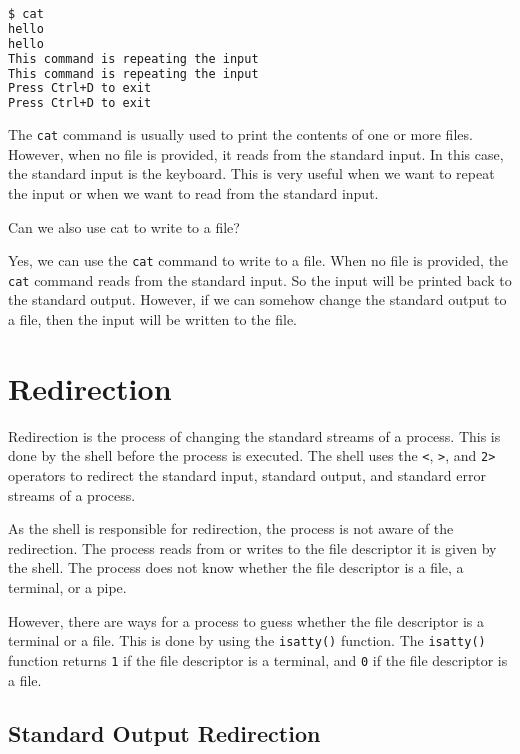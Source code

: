\begin{lstlisting}[language=bash]
$ cat
hello
hello
This command is repeating the input
This command is repeating the input
Press Ctrl+D to exit
Press Ctrl+D to exit
\end{lstlisting}

The \lstinline|cat| command is usually used to print the contents of one
or more files. However, when no file is provided, it reads from the
standard input. In this case, the standard input is the keyboard.
This is very useful when we want to repeat the input or when we want
to read from the standard input.

\begin{qs}
  Can we also use cat to write to a file?
\end{qs}

\begin{ans}
  Yes, we can use the \lstinline|cat| command to write to a file. When
  no file is provided, the \lstinline|cat| command reads from the standard
  input. So the input will be printed back to the standard output.
  However, if we can somehow change the standard output to a file,
  then the input will be written to the file.
\end{ans}

\section{Redirection}

Redirection is the process of changing the standard streams of a process.
This is done by the shell before the process is executed. The shell
uses the \lstinline|<|, \lstinline|>|, and \lstinline|2>| operators to redirect
the standard input, standard output, and standard error streams of a
process.

As the shell is responsible for redirection, the process is not aware
of the redirection. The process reads from or writes to the file descriptor
it is given by the shell. The process does not know whether the file
descriptor is a file, a terminal, or a pipe.

However, there are ways for a process to guess whether the file descriptor
is a terminal or a file. This is done by using the \lstinline|isatty()|
function. The \lstinline|isatty()| function returns \lstinline|1| if the file
descriptor is a terminal, and \lstinline|0| if the file descriptor is a file.

\subsection{Standard Output Redirection}

